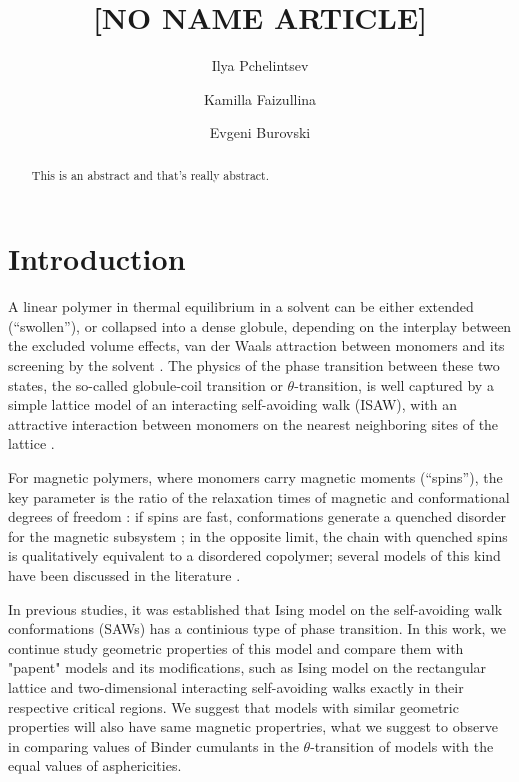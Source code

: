 \documentclass[aps,pre,amssymb,amsmath,twocolumn,floatfix]{revtex4-2}
\begin{document}
\title{[NO NAME ARTICLE]}

\author{Ilya Pchelintsev}
\author{Kamilla Faizullina}
\author{Evgeni Burovski}



\begin{abstract}
    This is an abstract and that's really abstract.
\end{abstract}

\maketitle

\section{Introduction}

A linear polymer in thermal equilibrium in a solvent can be either extended (``swollen''), or collapsed into a dense globule, depending on the interplay between the excluded volume effects, van der Waals attraction between monomers and its screening by the solvent \cite{deGennes1979}. The physics of the phase transition between these two states, the so-called globule-coil transition or $\theta$-transition, is well captured by a simple lattice model of an interacting self-avoiding walk (ISAW), with an attractive interaction between monomers on the nearest neighboring sites of the lattice \cite{Vanderzande1998}.

For magnetic polymers, where monomers carry magnetic moments (``spins''), the key parameter is the ratio of the relaxation times of magnetic and conformational degrees of freedom \cite{Aerstens1992}: if spins are fast, conformations generate a quenched disorder for the magnetic subsystem  \cite{Aerstens1992, Chakrabarti1983, Chakrabarti1985, Papale2018}; in the opposite limit, the chain with quenched spins is qualitatively equivalent to a disordered copolymer; several models of this kind have been discussed in the literature \cite{Shakhnovich1994, KHOKHLOV1998, KHOKHLOV2012, Blavatska2014}.

In previous studies\cite{faizullina2021critical}, it was established that Ising model on the self-avoiding walk conformations (SAWs) has a continious type of phase transition. In this work, we continue study geometric properties of this model and compare them with "papent" models and its modifications, such as Ising model on the rectangular lattice\cite{Selke2006} and two-dimensional interacting self-avoiding walks exactly in their respective critical regions. We suggest that models with similar geometric properties will also have same magnetic propertries, what we suggest to observe in comparing values of Binder cumulants in the $\theta$-transition of models with the equal values of asphericities.
\end{document}

